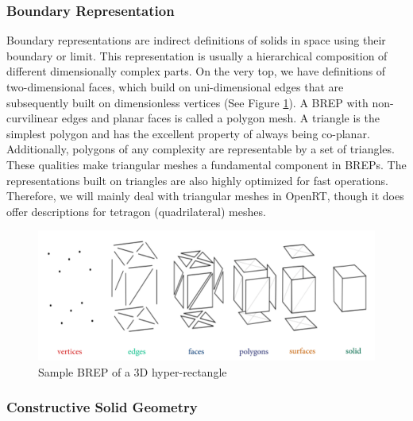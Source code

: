 \documentclass[a4paper,11pt,oneside]{article}
\begin{document}
\subsubsection{Boundary Representation}
    
Boundary representations are indirect definitions of solids in space using their boundary or limit. This representation is usually a hierarchical composition of different dimensionally complex parts. On the very top, we have definitions of two-dimensional faces, which build on uni-dimensional edges that are subsequently built on dimensionless vertices (See Figure \ref{fig2:brep_3d_rect}). A BREP with non-curvilinear edges and planar faces is called a polygon mesh. A triangle is the simplest polygon and has the excellent property of always being co-planar. Additionally, polygons of any complexity are representable by a set of triangles. These qualities make triangular meshes a fundamental component in BREPs. The representations built on triangles are also highly optimized for fast operations. Therefore, we will mainly deal with triangular meshes in OpenRT, though it does offer descriptions for tetragon (quadrilateral) meshes.
    
    
\begin{figure}[ht]
	\begin{center}
		\includegraphics[width=.8\textwidth]{section1/brep-overview.png}
	\end{center}
	\caption{Sample BREP of a 3D hyper-rectangle \cite{wikipedia_2021_mesh_rep}}
	\label{fig2:brep_3d_rect}
\end{figure}
    
\subsubsection{Constructive Solid Geometry}
\end{document}
